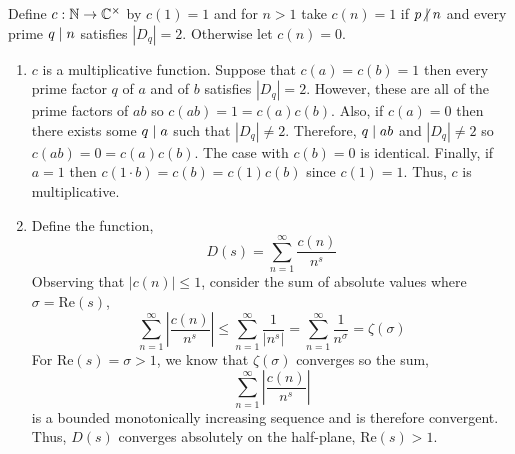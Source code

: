 \documentclass[12pt]{extarticle}
\begin{document}
\begin{enumerate}
Define $c : \mathbb{N} \to \mathbb{C}^\times$ by $c(1) = 1$ and for $n > 1$ take $c(n) = 1$ if $p \ndivides n$ and every prime $q \mid n$ satisfies $|D_q| = 2$. Otherwise let $c(n) = 0$. 
\begin{enumerate}
\item $c$ is a multiplicative function. Suppose that $c(a) = c(b) = 1$ then every prime factor $q$ of $a$ and of $b$ satisfies $|D_q| = 2$. However, these are all of the prime factors of $ab$ so $c(ab) = 1 = c(a) c(b)$. Also, if $c(a) = 0$ then there exists some $q \mid a$ such that $|D_q| \neq 2$. Therefore, $q \mid ab$ and $|D_q| \neq 2$ so $c(ab) = 0 = c(a) c(b)$. The case with $c(b) = 0$ is identical. Finally, if $a = 1$ then $c(1 \cdot b) = c(b) = c(1) c(b)$ since $c(1) = 1$. Thus, $c$ is multiplicative.  

\item Define the function,
\[D(s) = \sum_{n = 1}^\infty \frac{c(n)}{n^s}\]
Observing that $|c(n)| \le 1$, consider the sum of absolute values where $\sigma = \mathrm{Re}(s)$,
\[ \sum_{n = 1}^\infty \left| \frac{c(n)}{n^s} \right| \le \sum_{n = 1}^\infty\frac{1}{|n^s|} = \sum_{n = 1}^\infty\frac{1}{n^\sigma} = \zeta(\sigma) \]
For $\mathrm{Re}(s) = \sigma > 1$, we know that $\zeta(\sigma)$ converges so the sum,
\[ \sum_{n = 1}^\infty \left| \frac{c(n)}{n^s} \right| \]
is a bounded monotonically increasing sequence and is therefore convergent. Thus, $D(s)$ converges absolutely on the half-plane, $\mathrm{Re}(s) > 1$. 


\end{enumerate}
\end{enumerate}
\end{document}
